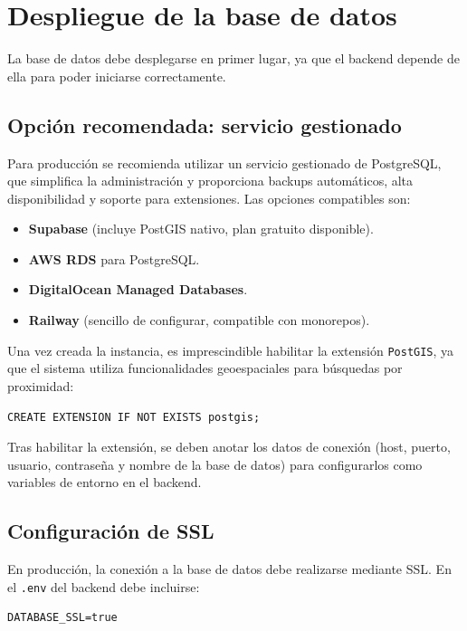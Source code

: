 \section{Despliegue de la base de datos}

La base de datos debe desplegarse en primer lugar, ya que el backend depende de ella para poder iniciarse correctamente.

\subsection{Opción recomendada: servicio gestionado}

Para producción se recomienda utilizar un servicio gestionado de PostgreSQL, que simplifica la administración y proporciona backups automáticos, alta disponibilidad y soporte para extensiones. Las opciones compatibles son:

\begin{itemize}
    \item \textbf{Supabase} (incluye PostGIS nativo, plan gratuito disponible).
    \item \textbf{AWS RDS} para PostgreSQL.
    \item \textbf{DigitalOcean Managed Databases}.
    \item \textbf{Railway} (sencillo de configurar, compatible con monorepos).
\end{itemize}

Una vez creada la instancia, es imprescindible habilitar la extensión \texttt{PostGIS}, ya que el sistema utiliza funcionalidades geoespaciales para búsquedas por proximidad:

\begin{lstlisting}
CREATE EXTENSION IF NOT EXISTS postgis;
\end{lstlisting}

Tras habilitar la extensión, se deben anotar los datos de conexión (host, puerto, usuario, contraseña y nombre de la base de datos) para configurarlos como variables de entorno en el backend.

\subsection{Configuración de SSL}

En producción, la conexión a la base de datos debe realizarse mediante SSL. En el \texttt{.env} del backend debe incluirse:

\begin{lstlisting}
DATABASE_SSL=true
\end{lstlisting}

